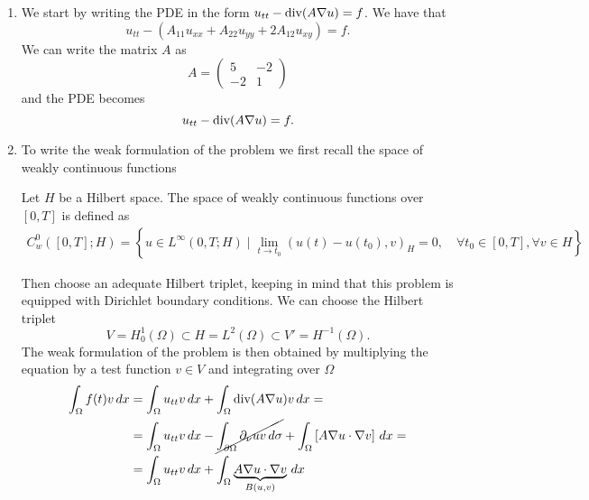 \begin{enumerate}
    \item We start by writing the PDE in the form \(u_{tt} - \text{div}(A \nabla u) = f\). We
          have that
          \[
              u_{tt} - \left(A_{11} u_{xx} + A_{22} u_{yy} + 2A_{12} u_{xy}\right) = f.
          \]
          We can write the matrix \(A\) as
          \[
              A = \begin{pmatrix}
                  5  & -2 \\
                  -2 & 1
              \end{pmatrix}
          \]
          and the PDE becomes
          \[
              u_{tt} - \text{div} (A \nabla u) = f.
          \]
    \item To write the weak formulation of the problem we first recall the space of
          weakly continuous functions
          \begin{remark}
              Let \(H\) be a Hilbert space. The space of weakly continuous functions over \([0, T]\) is defined as
              \[
                  \begin{split}
                      C_w^0([0, T]; H) = \left\{ u \in L^\infty(0, T; H) \mid \lim_{t \to t_0} (u(t) - u(t_0), v)_H = 0, \quad \forall t_0 \in [0, T], \forall v \in H \right\}
                  \end{split}
              \]
          \end{remark}
          Then choose an adequate Hilbert triplet, keeping in mind that this problem is equipped with Dirichlet boundary conditions. We can choose the Hilbert triplet
          \[
              V = H^1_0(\Omega) \subset H = L^2(\Omega) \subset V' = H^{-1}(\Omega).
          \]
          The weak formulation of the problem is then obtained by multiplying the
          equation by a test function \(v \in V\) and integrating over \(\Omega\)
          \begin{align*}
              \int_\Omega f(t) v \, dx & = \int_\Omega u_{tt} v \, dx + \int_\Omega \text{div}(A \nabla u)v \, dx =                                                                                  \\
                                       & = \int_\Omega u_{tt} v \, dx - \cancel{\int_{\partial\Omega} \partial_\nu u v \, d\sigma} + \int_\Omega \left[A \nabla u \cdot \nabla v\right] \, dx = \\
                                       & = \int_\Omega u_{tt} v \, dx + \int_\Omega \underbrace{A \nabla u \cdot \nabla v}_{B(u, v)} \, dx
          \end{align*}

\end{enumerate}
